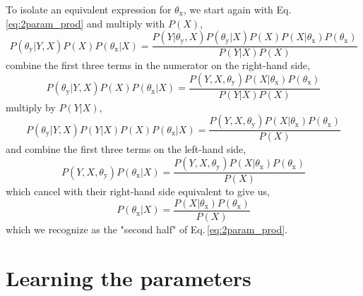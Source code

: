 \documentclass[]{report}
\begin{document}
To isolate an equivalent expression for $\theta_\mathrm{x}$, we start again with Eq.\,\ref{eq:2param_prod} and multiply with $P(X)$,
\begin{equation}
P(\theta_\mathrm{y}|Y, X)P(X)P(\theta_\mathrm{x}|X) = \frac{P(Y|\theta_\mathrm{y}, X)P(\theta_\mathrm{y}|X)P(X)P(X|\theta_\mathrm{x})P(\theta_\mathrm{x})}{P(Y|X)P(X)}
\end{equation}
combine the first three terms in the numerator on the right-hand side,
\begin{equation}
P(\theta_\mathrm{y}|Y, X)P(X)P(\theta_\mathrm{x}|X) = \frac{P(Y, X, \theta_\mathrm{y})P(X|\theta_\mathrm{x})P(\theta_\mathrm{x})}{P(Y|X)P(X)}
\end{equation}
multiply by $P(Y|X)$,
\begin{equation}
P(\theta_\mathrm{y}|Y, X)P(Y|X)P(X)P(\theta_\mathrm{x}|X) = \frac{P(Y, X, \theta_\mathrm{y})P(X|\theta_\mathrm{x})P(\theta_\mathrm{x})}{P(X)}
\end{equation}
and combine the first three terms on the left-hand side, 
\begin{equation}
P(Y, X, \theta_\mathrm{y})P(\theta_\mathrm{x}|X) = \frac{P(Y, X, \theta_\mathrm{y})P(X|\theta_\mathrm{x})P(\theta_\mathrm{x})}{P(X)}
\end{equation}
which cancel with their right-hand side equivalent to give us,
\begin{equation}
P(\theta_\mathrm{x}|X) = \frac{P(X|\theta_\mathrm{x})P(\theta_\mathrm{x})}{P(X)}
\end{equation} \label{eq:2param_X}
which we recognize as the "second half" of Eq.\,\ref{eq:2param_prod}.

\section{Learning the parameters}
\end{document}
